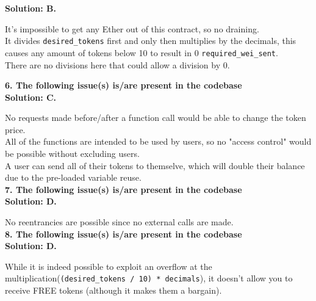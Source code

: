 \textbf{Solution: B.}

It's impossible to get any Ether out of this contract, so no draining.\\
It divides \verb|desired_tokens| first and only then multiplies by the decimals, this causes any amount of tokens below 10 to result in 0 \verb|required_wei_sent|.\\
There are no divisions here that could allow a division by 0.\\

\pagebreak

\textbf{6. The following issue(s) is/are present in the codebase}\label{sec:exam5_q6}\\

\textbf{Solution: C.}

No requests made before/after a function call would be able to change the token price.\\
All of the functions are intended to be used by users, so no "access control" would be possible without excluding users.\\
A user can send all of their tokens to themselve, which will double their balance due to the pre-loaded variable reuse.\\

\textbf{7. The following issue(s) is/are present in the codebase}\label{sec:exam5_q7}\\

\textbf{Solution: D.}

No reentrancies are possible since no external calls are made.\\

\textbf{8. The following issue(s) is/are present in the codebase}\label{sec:exam5_q8}\\

\textbf{Solution: D.}

While it is indeed possible to exploit an overflow at the multiplication\linebreak (\verb|(desired_tokens / 10) * decimals|), it doesn't allow you to receive FREE tokens (although it makes them a bargain).\\